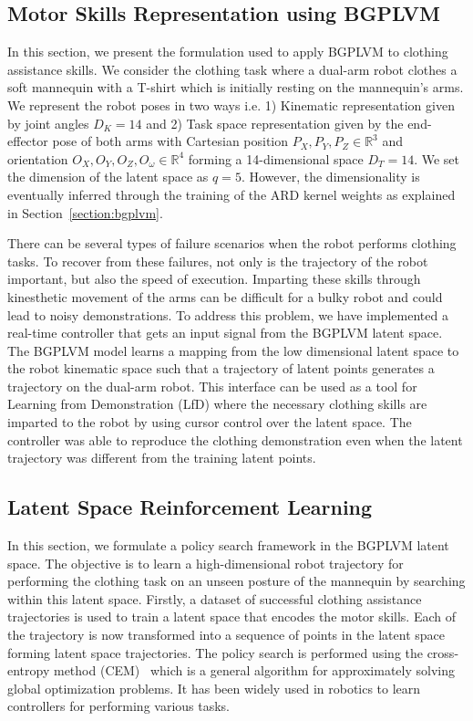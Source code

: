 \documentclass{article}
\begin{document}
\subsection{Motor Skills Representation using BGPLVM}
\label{section:clothassist}

In this section, we present the formulation used to apply BGPLVM to clothing assistance skills. We consider the clothing task where a dual-arm robot clothes a soft mannequin with a T-shirt which is initially resting on the mannequin's arms. We represent the robot poses in two ways i.e. 1) Kinematic representation given by joint angles $D_K = 14$ and 2) Task space representation given by the end-effector pose of both arms with Cartesian position ${P_X,P_Y,P_Z} \in \mathbb{R}^3$ and orientation ${O_X,O_Y,O_Z,O_{\omega}} \in \mathbb{R}^4$ forming a 14-dimensional space $D_T = 14$. We set the dimension of the latent space as $q = 5$. However, the dimensionality is eventually inferred through the training of the ARD kernel weights as explained in Section~\ref{section:bgplvm}.

There can be several types of failure scenarios when the robot performs clothing tasks. To recover from these failures, not only is the trajectory of the robot important, but also the speed of execution. Imparting these skills through kinesthetic movement of the arms can be difficult for a bulky robot and could lead to noisy demonstrations. To address this problem, we have implemented a real-time controller that gets an input signal from the BGPLVM latent space. The BGPLVM model learns a mapping from the low dimensional latent space to the robot kinematic space such that a trajectory of latent points generates a trajectory on the dual-arm robot. This interface can be used as a tool for Learning from Demonstration (LfD) where the necessary clothing skills are imparted to the robot by using cursor control over the latent space. The controller was able to reproduce the clothing demonstration even when the latent trajectory was different from the training latent points.

\subsection{Latent Space Reinforcement Learning}
\label{section:latentrl}

In this section, we formulate a policy search framework in the BGPLVM latent space. The objective is to learn a high-dimensional robot trajectory for performing the clothing task on an unseen posture of the mannequin by searching within this latent space. Firstly, a dataset of successful clothing assistance trajectories is used to train a latent space that encodes the motor skills. Each of the trajectory is now transformed into a sequence of points in the latent space forming latent space trajectories. The policy search is performed using the cross-entropy method (CEM)~\cite{cem} which is a general algorithm for approximately solving global optimization problems. It has been widely used in robotics to learn controllers for performing various tasks.
\end{document}
